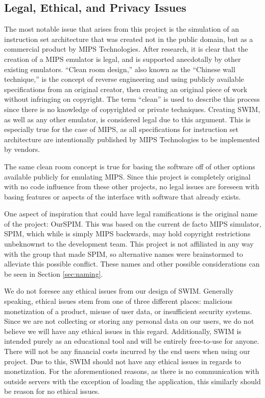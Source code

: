 \documentclass[
    paper=letter,
    parskip=half,
    fontsize=12pt,
    titlepage=firstiscover,
    toc=bibliography,
    numbers=endperiod
]{scrartcl}
\begin{document}
\subsection{Legal, Ethical, and Privacy Issues}
The most notable issue that arises from this project is the simulation of an instruction set architecture that was created not in the public domain, but as a commercial product by MIPS Technologies. After research, it is clear that the creation of a MIPS emulator is legal, and is supported anecdotally by other existing emulators. “Clean room design,” also known as the “Chinese wall technique,” is the concept of reverse engineering and using publicly available specifications from an original creator, then creating an original piece of work without infringing on copyright. The term “clean” is used to describe this process since there is no knowledge of copyrighted or private techniques. Creating SWIM, as well as any other emulator, is considered legal due to this argument. This is especially true for the case of MIPS, as all specifications for instruction set architecture are intentionally published by MIPS Technologies to be implemented by vendors.

The same clean room concept is true for basing the software off of other options available publicly for emulating MIPS. Since this project is completely original with no code influence from these other projects, no legal issues are foreseen with basing features or aspects of the interface with software that already exists.

One aspect of inspiration that could have legal ramifications is the original name of the project: OurSPIM. This was based on the current de facto MIPS simulator, SPIM, which while is simply MIPS backwards, may hold copyright restrictions unbeknownst to the development team. This project is not affiliated in any way with the group that made SPIM, so alternative names were brainstormed to alleviate this possible conflict. These names and other possible considerations can be seen in Section \ref{sec:naming}.

We do not foresee any ethical issues from our design of SWIM. Generally speaking, ethical issues stem from one of three different places: malicious monetization of a product, misuse of user data, or insufficient security systems. Since we are not collecting or storing any personal data on our users, we do not believe we will have any ethical issues in this regard. Additionally, SWIM is intended purely as an educational tool and will be entirely free-to-use for anyone. There will not be any financial costs incurred by the end users when using our project. Due to this, SWIM should not have any ethical issues in regards to monetization. For the aforementioned reasons, as there is no communication with outside servers with the exception of loading the application, this similarly should be reason for no ethical issues.
\end{document}
